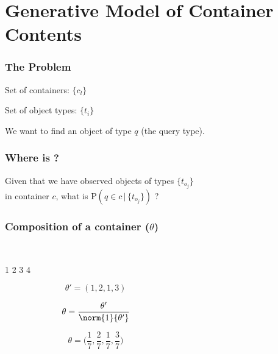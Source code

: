 
\section{Generative Model of Container Contents}
\begin{frame}
  \frametitle{The Problem}
  \begin{center}
    \vspace{-0.13in}
    Set of containers: $\{c_l\}$


    Set of object types: $\{t_i\}$


    We want to find an object of type $q$ (the query type).


  \end{center}
\end{frame}

\begin{frame}
  \frametitle{Where is ?}
  \begin{center}

    \vspace{0.3in}

    Given that we have observed objects of types $\{t_{o_j}\}$ \\
    in container $c$, what is $\mathrm{P}(q \in c \, | \, \{t_{o_j}\})$ ?
  \end{center}
\end{frame}

\begin{frame}
  \frametitle{Composition of a container ($\theta$)}
  \begin{columns}
    \begin{column}{0.7\textwidth}
      \begin{center}
        \\
        \hspace{0.1in} 1 \hspace{0.2in} 2 \hspace{0.08in} 3 \hspace{0.08in} 4

        \begin{equation*}
          \theta' = (1, 2, 1, 3)
        \end{equation*}

        \begin{equation*}
          \theta = \frac{\theta'}{\norm{1}{\theta'}}
        \end{equation*}

        \begin{equation*}
          \theta = \Big ( \frac17, \frac27, \frac17, \frac37 \Big )
        \end{equation*}
      \end{center}
    \end{column}
    \begin{column}{0.3\textwidth}
    \end{column}
  \end{columns}
\end{frame}

